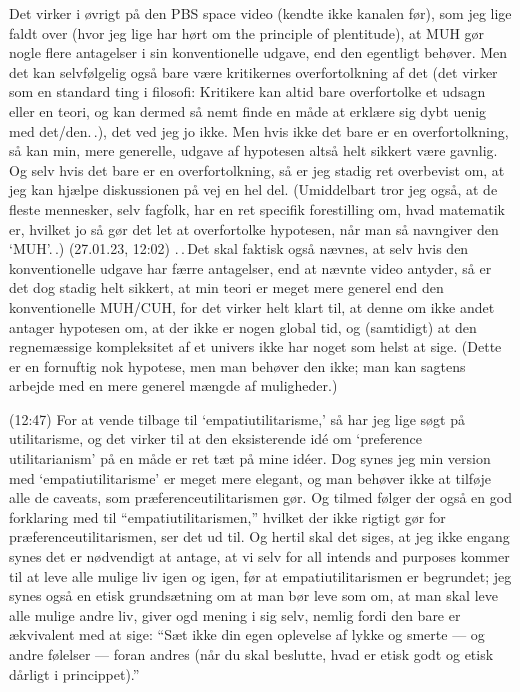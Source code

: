 \documentclass{report}
\begin{document}
Det virker i øvrigt på den PBS space video (kendte ikke kanalen før), som jeg lige faldt over (hvor jeg lige har hørt om the principle of plentitude), at MUH gør nogle flere antagelser i sin konventionelle udgave, end den egentligt behøver. Men det kan selvfølgelig også bare være kritikernes overfortolkning af det (det virker som en standard ting i filosofi: Kritikere kan altid bare overfortolke et udsagn eller en teori, og kan dermed så nemt finde en måde at erklære sig dybt uenig med det/den.\,.), det ved jeg jo ikke. Men hvis ikke det bare er en overfortolkning, så kan min, mere generelle, udgave af hypotesen altså helt sikkert være gavnlig. Og selv hvis det bare er en overfortolkning, så er jeg stadig ret overbevist om, at jeg kan hjælpe diskussionen på vej en hel del. (Umiddelbart tror jeg også, at de fleste mennesker, selv fagfolk, har en ret specifik forestilling om, hvad matematik er, hvilket jo så gør det let at overfortolke hypotesen, når man så navngiver den `MUH'.\,.) (27.01.23, 12:02) .\,.\,Det skal faktisk også nævnes, at selv hvis den konventionelle udgave har færre antagelser, end at nævnte video antyder, så er det dog stadig helt sikkert, at min teori er meget mere generel end den konventionelle MUH/CUH, for det virker helt klart til, at denne om ikke andet antager hypotesen om, at der ikke er nogen global tid, og (samtidigt) at den regnemæssige kompleksitet af et univers ikke har noget som helst at sige. (Dette er en fornuftig nok hypotese, men man behøver den ikke; man kan sagtens arbejde med en mere generel mængde af muligheder.)

(12:47) For at vende tilbage til `empatiutilitarisme,' så har jeg lige søgt på utilitarisme, og det virker til at den eksisterende idé om `preference utilitarianism' på en måde er ret tæt på mine idéer. Dog synes jeg min version med `empatiutilitarisme' er meget mere elegant, og man behøver ikke at tilføje alle de caveats, som præferenceutilitarismen gør. Og tilmed følger der også en god forklaring med til ``empatiutilitarismen,'' hvilket der ikke rigtigt gør for præferenceutilitarismen, ser det ud til. Og hertil skal det siges, at jeg ikke engang synes det er nødvendigt at antage, at vi selv for all intends and purposes kommer til at leve alle mulige liv igen og igen, før at empatiutilitarismen er begrundet; jeg synes også en etisk grundsætning om at man bør leve som om, at man skal leve alle mulige andre liv, giver ogd mening i sig selv, nemlig fordi den bare er ækvivalent med at sige: ``Sæt ikke din egen oplevelse af lykke og smerte --- og andre følelser --- foran andres (når du skal beslutte, hvad er etisk godt og etisk dårligt i princippet).'' 
\end{document}
